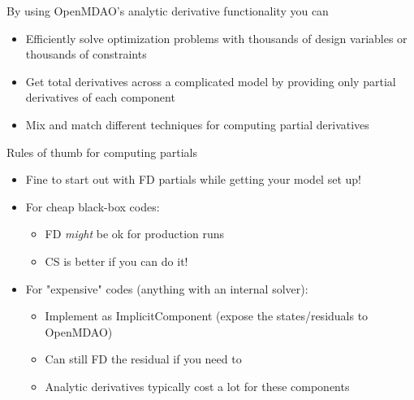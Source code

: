 \documentclass[aspectratio=169, usenames,dvipsnames, 14pt]{beamer}
\begin{document}
\begin{frame}{By using OpenMDAO's analytic derivative functionality you can}
	\begin{itemize}
		\item Efficiently solve optimization problems with thousands of design variables or thousands of constraints
		\item Get total derivatives across a complicated model by providing only partial derivatives of each component
		\item Mix and match different techniques for computing partial derivatives
	\end{itemize}
\end{frame}

\begin{frame}{Rules of thumb for computing partials}
	\begin{itemize}
		\item Fine to start out with FD partials while getting your model set up!
		\item For cheap black-box codes:		
			\begin{itemize}
				\item FD \textit{might} be ok for production runs
				\item CS is better if you can do it!
			\end{itemize}
		\item For "expensive" codes (anything with an internal solver):
			\begin{itemize}
				\item Implement as ImplicitComponent (expose the states/residuals to OpenMDAO)
				\item Can still FD the residual if you need to
				\item Analytic derivatives typically cost a lot for these components
			\end{itemize}
	\end{itemize}
\end{frame}
\end{document}
